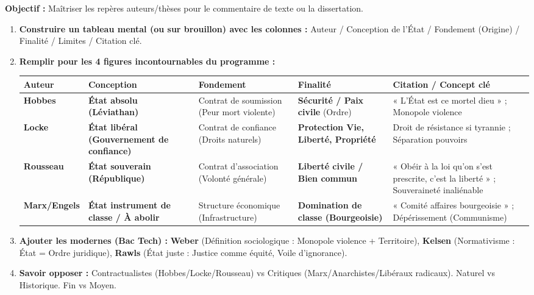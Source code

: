 \documentclass[11pt]{article}
\begin{document}
\begin{methode}
\textbf{Objectif :} Maîtriser les repères auteurs/thèses pour le commentaire de texte ou la dissertation.
\begin{enumerate}
    \item \textbf{Construire un tableau mental (ou sur brouillon) avec les colonnes :} Auteur / Conception de l'État / Fondement (Origine) / Finalité / Limites / Citation clé.
    \item \textbf{Remplir pour les 4 figures incontournables du programme :}
    \begin{center}
    \begin{tabularx}{\linewidth}{|l|X|X|X|X|}\hline
    \textbf{Auteur} & \textbf{Conception} & \textbf{Fondement} & \textbf{Finalité} & \textbf{Citation / Concept clé} \\ \hline
    \textbf{Hobbes} & \textbf{État absolu (Léviathan)} & Contrat de soumission (Peur mort violente) & \textbf{Sécurité / Paix civile} (Ordre) & « L'État est ce mortel dieu » ; Monopole violence \\ \hline
    \textbf{Locke} & \textbf{État libéral (Gouvernement de confiance)} & Contrat de confiance (Droits naturels) & \textbf{Protection Vie, Liberté, Propriété} & Droit de résistance si tyrannie ; Séparation pouvoirs \\ \hline
    \textbf{Rousseau} & \textbf{État souverain (République)} & Contrat d'association (Volonté générale) & \textbf{Liberté civile / Bien commun} & « Obéir à la loi qu'on s'est prescrite, c'est la liberté » ; Souveraineté inaliénable \\ \hline
    \textbf{Marx/Engels} & \textbf{État instrument de classe / À abolir} & Structure économique (Infrastructure) & \textbf{Domination de classe (Bourgeoisie)} & « Comité affaires bourgeoisie » ; Dépérissement (Communisme) \\ \hline
    \end{tabularx}
    \end{center}
    \item \textbf{Ajouter les modernes (Bac Tech) :} \textbf{Weber} (Définition sociologique : Monopole violence + Territoire), \textbf{Kelsen} (Normativisme : État = Ordre juridique), \textbf{Rawls} (État juste : Justice comme équité, Voile d'ignorance).
    \item \textbf{Savoir opposer :} Contractualistes (Hobbes/Locke/Rousseau) vs Critiques (Marx/Anarchistes/Libéraux radicaux). Naturel vs Historique. Fin vs Moyen.
\end{enumerate}
\end{methode}
\end{document}
